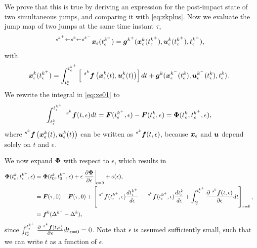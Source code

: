 \documentclass[../DC2017114Bouma.tex]{subfiles}
\begin{document}
We prove that this is true by deriving an expression for the post-impact state of two simultaneous jumps, and comparing it with \eqref{eq:zkplus}. Now we evaluate the jump map of two jumps at the same time instant $\tau$,
\begin{align}
\ ^{s^{k^+}\leftarrow s^{k}\leftarrow s^{k^-}}{\boldsymbol{x}}_\epsilon(t_\epsilon^{k^+}) = {\boldsymbol{g}}^{k^+}({\boldsymbol{x}}^{k}_\epsilon(t_\epsilon^{k^+}),{\boldsymbol{u}}^{k}_\epsilon(t_\epsilon^{k^+}),t_\epsilon^{k^+}),\label{eq:xe012}
\end{align}
with
\begin{align}
\xb^{k}_\epsilon(t_\epsilon^{k^+}) = \int_{t_\epsilon^{k}}^{t_\epsilon^{k^+}}\left[\ ^{s^{k}}\fb\left(\xb^{k}_\epsilon(t),\ub^{k}_\epsilon(t)\right)\right]dt + \gb^{k}(\xb^{k^-}_\epsilon(t_\epsilon^{k}),\ub^{k^-}_\epsilon(t_\epsilon^{k}),t_\epsilon^{k}).\label{eq:xe01}
\end{align}
We rewrite the integral in \eqref{eq:xe01} to
\begin{align}
\int_{t_\epsilon^{k}}^{t_\epsilon^{k^+}}\ ^{s^{k}}{\boldsymbol{f}}(t,\epsilon)dt = {\boldsymbol{F}}(t_\epsilon^{k^+},\epsilon) - {\boldsymbol{F}}(t_\epsilon^{k},\epsilon) = \boldsymbol{\Phi}(t_\epsilon^{k},t_\epsilon^{k^+},\epsilon),
\end{align}
where $^{s^{k}}{\boldsymbol{f}}\left({\boldsymbol{x}}^{k}_\epsilon(t),{\boldsymbol{u}}^{k}_\epsilon(t)\right)$ can be written as $^{s^{k}}{\boldsymbol{f}}(t,\epsilon)$, because ${\boldsymbol{x}}_\epsilon$ and ${\boldsymbol{u}}$ depend solely on $t$ and $\epsilon$.

We now expand $\boldsymbol{\Phi}$ with respect to $\epsilon$, which results in
\begin{align}
\Phib(t_\epsilon^{k},t_\epsilon^{k^+},\epsilon) &= \Phib(t_0^{k},t_0^{k^+},\epsilon) + \epsilon\left.\frac{\partial\Phib}{\partial\epsilon}\right|_{\epsilon = 0} + o(\epsilon),\\
&= \Fb(\tau,0) - \Fb(\tau,0) + \left[\ ^{s^{k}}\fb(t^{k^+}_\epsilon,\epsilon)\frac{dt^{k^+}_\epsilon}{d\epsilon} - \ ^{s^{k}}\fb(t^{k^+}_\epsilon,\epsilon)\frac{dt^{k}_\epsilon}{d\epsilon} + \int_{t^{k}_\epsilon}^{t^{k^+}_\epsilon}\frac{\partial\ ^{s^{k}}\fb(t,\epsilon)}{\partial\epsilon}dt\right]_{\epsilon=0},\\
&= \fb^{k}(\Delta^{k^+}-\Delta^{k}), 
\end{align}
since $\int_{t^{k}_\epsilon}^{t^{k^+}_\epsilon}\frac{\partial\ ^{s^{k}}\fb(t,\epsilon)}{\partial\epsilon}dt_{\epsilon = 0} = 0$.
Note that $\epsilon$ is assumed sufficiently small, such that we can write $t$ as a function of $\epsilon$.
\end{document}
